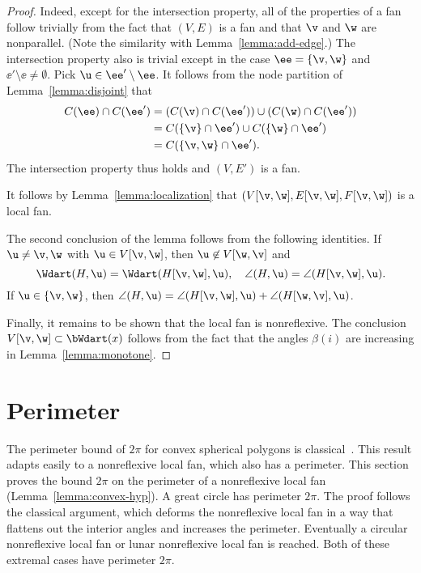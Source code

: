 \begin{proof} 
Indeed, except for the intersection property, all of the properties
of a fan follow trivially from the fact that $(V,E)$ is a fan and
that $\v$ and $\w$ are nonparallel.  (Note the similarity with
Lemma~\ref{lemma:add-edge}.)  The intersection property also is
trivial except in the case $\ee=\{\v,\w\}$ and $\ee'\setminus \ee\ne
\emptyset$.  Pick $\u\in \ee'\setminus\ee$.  It follows from the
node partition of Lemma~\ref{lemma:disjoint} that
\begin{align*}
C(\ee) \cap C(\ee') &= (C(\v) \cap C(\ee')) \cup (C(\w)\cap C(\ee')) \\
&= C(\{\v\}\cap \ee') \cup C(\{\w\}\cap \ee') \\
&= C(\{\v,\w\}\cap \ee').
\end{align*}
The intersection property thus holds and $(V,E')$ is a fan.

It follows by Lemma~\ref{lemma:localization} that
$(V[\v,\w],E[\v,\w],F[\v,\w])$ is a local fan.

The second conclusion of the lemma follows from the following identities.
If $\u\ne \v,\w$ with $\u\in V[\v,\w]$, then $\u\not\in V[\w,\v]$ and 
\begin{equation}
\Wdart(H,\u)=\Wdart(H[\v,\w],\u),\quad \angle(H,\u) = \angle(H[\v,\w],\u).
\end{equation}
If $\u\in\{\v,\w\}$, then 
$\angle(H,\u)=\angle(H[\v,\w],\u) +\angle(H[\w,\v],\u)$.

Finally, it remains to be shown that the local fan is nonreflexive.
The conclusion $V[\v,\w]\subset \bWdart(x)$ follows from the
fact that the angles $\beta(i)$ are increasing in
Lemma~\ref{lemma:monotone}.
\end{proof}





\section{Perimeter}

The perimeter bound of $2\pi$ for convex spherical polygons is
classical~\cite[p.~100]{vanderWaerden:1951}.  This result adapts
easily to a nonreflexive local fan, which also has a perimeter.  This
section proves the bound $2\pi$ on the perimeter of a nonreflexive
local fan (Lemma~\ref{lemma:convex-hyp}).  A great circle has
perimeter $2\pi$.  The proof follows the classical argument, which
deforms the nonreflexive local fan in a way that flattens out the
interior angles and increases the perimeter.  Eventually a circular
nonreflexive local fan or lunar nonreflexive local fan is reached.
Both of these extremal cases have perimeter $2\pi$.



